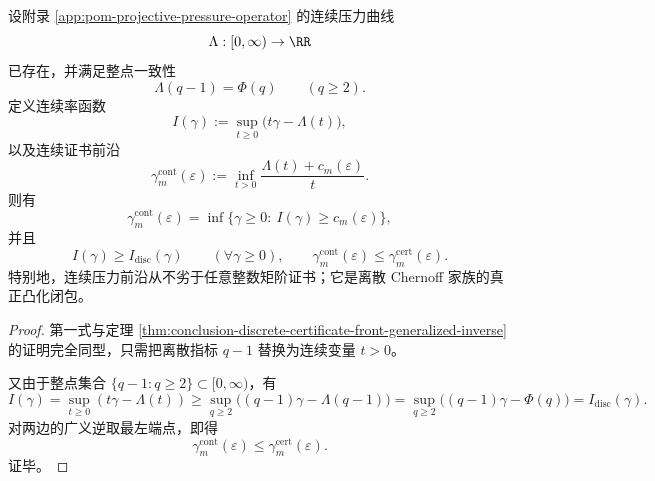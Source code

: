 \begin{theorem}[连续压力前沿对整数矩阶证书的严格支配]\label{thm:conclusion-continuous-pressure-front-dominates-discrete-certificate}
设附录 \ref{app:pom-projective-pressure-operator} 的连续压力曲线
\[
\Lambda:[0,\infty)\to\RR
\]
已存在，并满足整点一致性
\[
\Lambda(q-1)=\Phi(q)
\qquad
(q\ge 2).
\]
定义连续率函数
\[
I(\gamma):=\sup_{t\ge 0}\bigl(t\gamma-\Lambda(t)\bigr),
\]
以及连续证书前沿
\[
\gamma_m^{\mathrm{cont}}(\varepsilon):=
\inf_{t>0}\frac{\Lambda(t)+c_m(\varepsilon)}{t}.
\]
则有
\[
\gamma_m^{\mathrm{cont}}(\varepsilon)
=
\inf\bigl\{\gamma\ge 0:\ I(\gamma)\ge c_m(\varepsilon)\bigr\},
\]
并且
\[
I(\gamma)\ge I_{\mathrm{disc}}(\gamma)
\qquad(\forall \gamma\ge 0),
\qquad
\gamma_m^{\mathrm{cont}}(\varepsilon)\le \gamma_m^{\mathrm{cert}}(\varepsilon).
\]
特别地，连续压力前沿从不劣于任意整数矩阶证书；它是离散 Chernoff 家族的真正凸化闭包。
\end{theorem}
\begin{proof}
第一式与定理 \ref{thm:conclusion-discrete-certificate-front-generalized-inverse} 的证明完全同型，只需把离散指标 \(q-1\) 替换为连续变量 \(t>0\)。

又由于整点集合 \(\{q-1:q\ge 2\}\subset[0,\infty)\)，有
\[
I(\gamma)=\sup_{t\ge 0}(t\gamma-\Lambda(t))
\ge
\sup_{q\ge 2}\bigl((q-1)\gamma-\Lambda(q-1)\bigr)
=
\sup_{q\ge 2}\bigl((q-1)\gamma-\Phi(q)\bigr)
=
I_{\mathrm{disc}}(\gamma).
\]
对两边的广义逆取最左端点，即得
\[
\gamma_m^{\mathrm{cont}}(\varepsilon)\le \gamma_m^{\mathrm{cert}}(\varepsilon).
\]
证毕。
\end{proof}

